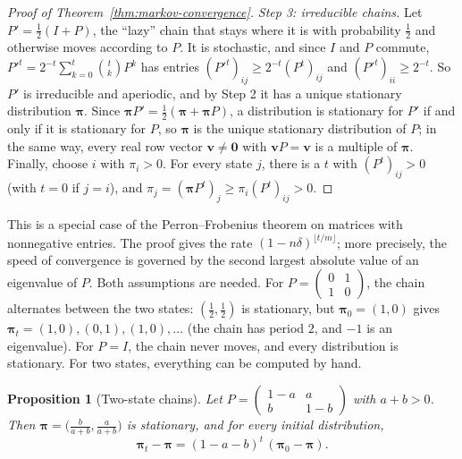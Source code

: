 \documentclass[11pt]{article}
\theoremstyle{definition}
\theoremstyle{plain}
\newtheorem{proposition}[definition]{Proposition}
\theoremstyle{remark}
\begin{document}
\begin{proof}[Proof of Theorem~\ref{thm:markov-convergence}]
    \emph{Step 3: irreducible chains.} Let $P' = \frac{1}{2}(I + P)$, the ``lazy'' chain that stays where it is with probability $\frac{1}{2}$ and otherwise moves according to $P$. It is stochastic, and since $I$ and $P$ commute, $P'^t = 2^{-t}\sum_{k=0}^t \binom{t}{k}P^k$ has entries $(P'^t)_{ij} \geq 2^{-t}(P^t)_{ij}$ and $(P'^t)_{ii} \geq 2^{-t}$. So $P'$ is irreducible and aperiodic, and by Step 2 it has a unique stationary distribution $\boldsymbol{\pi}$. Since $\boldsymbol{\pi}P' = \frac{1}{2}(\boldsymbol{\pi} + \boldsymbol{\pi}P)$, a distribution is stationary for $P'$ if and only if it is stationary for $P$, so $\boldsymbol{\pi}$ is the unique stationary distribution of $P$; in the same way, every real row vector $\mathbf{v} \neq \mathbf{0}$ with $\mathbf{v}P = \mathbf{v}$ is a multiple of $\boldsymbol{\pi}$. Finally, choose $i$ with $\pi_i > 0$. For every state $j$, there is a $t$ with $(P^t)_{ij} > 0$ (with $t = 0$ if $j = i$), and $\pi_j = (\boldsymbol{\pi}P^t)_j \geq \pi_i(P^t)_{ij} > 0$.
\end{proof}

This is a special case of the Perron--Frobenius theorem on matrices with nonnegative entries. The proof gives the rate $(1 - n\delta)^{\lfloor t/m \rfloor}$; more precisely, the speed of convergence is governed by the second largest absolute value of an eigenvalue of $P$. Both assumptions are needed. For $P = \left(\begin{smallmatrix} 0 & 1 \\ 1 & 0 \end{smallmatrix}\right)$, the chain alternates between the two states: $(\frac{1}{2}, \frac{1}{2})$ is stationary, but $\boldsymbol{\pi}_0 = (1, 0)$ gives $\boldsymbol{\pi}_t = (1, 0), (0, 1), (1, 0), \ldots$ (the chain has period $2$, and $-1$ is an eigenvalue). For $P = I$, the chain never moves, and every distribution is stationary. For two states, everything can be computed by hand.

\begin{proposition}[Two-state chains]\label{prop:two-state}
    Let $P = \begin{pmatrix} 1 - a & a \\ b & 1 - b \end{pmatrix}$ with $a + b > 0$. Then $\boldsymbol{\pi} = \big(\frac{b}{a + b}, \frac{a}{a + b}\big)$ is stationary, and for every initial distribution,
    \[\boldsymbol{\pi}_t - \boldsymbol{\pi} = (1 - a - b)^t\,(\boldsymbol{\pi}_0 - \boldsymbol{\pi}).\]
\end{proposition}
\end{document}
